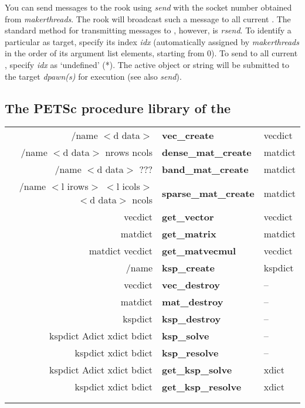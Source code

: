You can send messages to the rook using \emph{send} with the socket number obtained from \emph{makerthreads}. The rook will broadcast such a message to all current . The standard method for transmitting messages to , however, is \emph{rsend}. To identify a particular  as target, specify its index \emph{idx} (automatically assigned by \emph{makerthreads} in the order of its argument list elements, starting from 0). To send to all current , specify \emph{idx} as `undefined' (*). The active object or string will be submitted to the target \emph{dpawn(s)} for execution (see also \emph{send}).

\subsection{The PETSc procedure library of the }

\begin{tabular}{>{\sffamily}r>{\sffamily\bfseries}l>{\sffamily}l}
/name $<$d data$>$ & vec\_create & vecdict \\
/name $<$d data$>$ nrows ncols & dense\_mat\_create & matdict \\
/name $<$d data$>$ ??? & band\_mat\_create & matdict \\
/name $<$l irows$>$ $<$l icols$>$ $<$d data$>$ ncols & sparse\_mat\_create & matdict \\
vecdict & get\_vector & vecdict\\
matdict & get\_matrix & matdict\\
matdict vecdict & get\_matvecmul & vecdict\\
/name & ksp\_create & kspdict\\
vecdict & vec\_destroy & --\\
matdict & mat\_destroy & -- \\
kspdict & ksp\_destroy & --\\
kspdict Adict xdict bdict & ksp\_solve & --\\
kspdict xdict bdict & ksp\_resolve & --\\
kspdict Adict xdict bdict & get\_ksp\_solve & xdict\\
kspdict xdict bdict & get\_ksp\_resolve & xdict\\
\\\\
\end{tabular}


